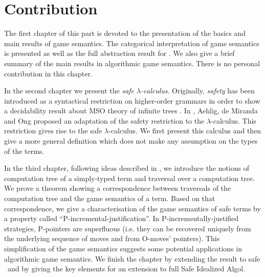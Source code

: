 \part{Contribution}

The first chapter of this part is devoted to the presentation of the
basics and main results of game semantics. The categorical
interpretation of game semantics is presented as well as the full
abstraction result for \pcf. We also give a brief summary of the
main results in algorithmic game semantics. There is no personal
contribution in this chapter.

In the second chapter we present the \emph{safe $\lambda$-calculus}.
Originally, \emph{safety} has been introduced as a syntactical
restriction on higher-order grammars in order to show a decidability
result about MSO theory of infinite trees \citep{KNU02}. In
\cite{safety-mirlong2004}, Aehlig, de Miranda and Ong  proposed an
adaptation of the safety restriction to the $\lambda$-calculus. This
restriction gives rise to the safe $\lambda$-calculus. We first
present this calculus and then give a more general definition which
does not make any assumption on the types of the terms.

In the third chapter, following ideas described in
\cite{OngLics2006}, we introduce the notions of computation tree of
a simply-typed term and traversal over a computation tree. We prove
a theorem showing a correspondence between traversals of the
computation tree and the game semantics of a term. Based on that
correspondence, we give a characterisation of the game semantics of
safe terms by a property called ``P-incremental-justification''. In
P-incrementally-justified strategies, P-pointers are superfluous (i.e.
they can be recovered uniquely from the underlying sequence of
moves and from O-moves' pointers). This simplification of the game semantics suggests some potential applications in algorithmic game semantics. We finish the
chapter by extending the result to safe \pcf\ and by giving the key
elements for an extension to full Safe Idealized Algol.



